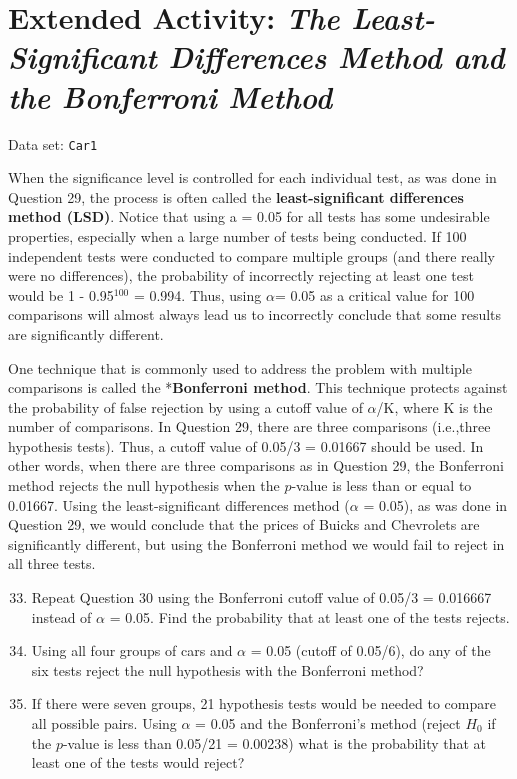 \documentclass[
]{report}
\begin{document}
\hypertarget{extended-activity-the-least-significant-differences-method-and-the-bonferroni-method}{%
\section*{\texorpdfstring{Extended Activity: \emph{The Least-Significant Differences Method and the Bonferroni Method}}{Extended Activity: The Least-Significant Differences Method and the Bonferroni Method}}\label{extended-activity-the-least-significant-differences-method-and-the-bonferroni-method}}

Data set: \texttt{Car1}

When the significance level is controlled for each individual test, as was done in Question 29, the process is often called the \textbf{least-significant differences method (LSD)}. Notice that using a = 0.05 for all tests has some undesirable properties, especially when a large number of tests being conducted. If 100 independent tests were conducted to compare multiple groups (and there really were no differences), the probability of incorrectly rejecting at least one test would be 1 - 0.95\(^{100}\) = 0.994. Thus, using \(\alpha\)= 0.05 as a critical value for 100 comparisons will almost always lead us to incorrectly conclude that some results are significantly different.

One technique that is commonly used to address the problem with multiple comparisons is called the *\textbf{Bonferroni method}. This technique protects against the probability of false rejection by using a cutoff value of \(\alpha\)/K, where K is the number of comparisons. In Question 29, there are three comparisons (i.e.,three hypothesis tests). Thus, a cutoff value of 0.05/3 = 0.01667 should be used. In other words, when there are three comparisons as in Question 29, the Bonferroni method rejects the null hypothesis when the \(p\)-value is less than or equal to 0.01667. Using the least-significant differences method (\(\alpha\) = 0.05), as was done in Question 29, we would conclude that the prices of Buicks and Chevrolets are significantly different, but using the Bonferroni method we would fail to reject in all three tests.

\begin{enumerate}
  \setcounter{enumi}{32}
  \item Repeat Question 30 using the Bonferroni cutoff value of 0.05/3 = 0.016667 instead of $\alpha$ = 0.05. Find the probability that at least one of the tests rejects.
  \item Using all four groups of cars and $\alpha$ = 0.05 (cutoff of 0.05/6), do any of the six tests reject the null hypothesis with the Bonferroni method?
  \item If there were seven groups, 21 hypothesis tests would be needed to compare all possible pairs. Using $\alpha$ = 0.05 and the Bonferroni’s method (reject $H_0$ if the $p$-value is less than 0.05/21 = 0.00238) what is the probability that at least one of the tests would reject?
\end{enumerate}
\end{document}
